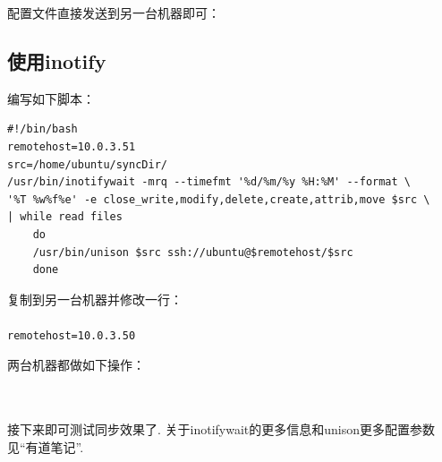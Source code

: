 配置文件直接发送到另一台机器即可：\\

\subsection{使用inotify}
编写如下脚本：\\
\begin{verbatim}
#!/bin/bash
remotehost=10.0.3.51    
src=/home/ubuntu/syncDir/
/usr/bin/inotifywait -mrq --timefmt '%d/%m/%y %H:%M' --format \
'%T %w%f%e' -e close_write,modify,delete,create,attrib,move $src \
| while read files
    do
    /usr/bin/unison $src ssh://ubuntu@$remotehost/$src
    done
\end{verbatim}

复制到另一台机器并修改一行：\\
 \\
\texttt{remotehost=10.0.3.50}

\par
两台机器都做如下操作：\\
\\
\\

\par
接下来即可测试同步效果了. 关于inotifywait的更多信息和unison更多配置参数见“有道笔记”. 